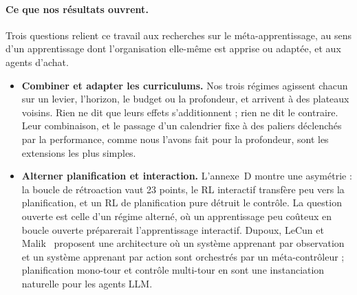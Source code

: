 \documentclass[11pt,a4paper]{article}
\begin{document}
\paragraph{Ce que nos résultats ouvrent.} Trois questions relient ce travail aux recherches sur le méta-apprentissage, au sens d'un apprentissage dont l'organisation elle-même est apprise ou adaptée, et aux agents d'achat.
\begin{itemize}
    \item \textbf{Combiner et adapter les curriculums.} Nos trois régimes agissent chacun sur un levier, l'horizon, le budget ou la profondeur, et arrivent à des plateaux voisins. Rien ne dit que leurs effets s'additionnent ; rien ne dit le contraire. Leur combinaison, et le passage d'un calendrier fixe à des paliers déclenchés par la performance, comme nous l'avons fait pour la profondeur, sont les extensions les plus simples.
    \item \textbf{Alterner planification et interaction.} L'annexe~D montre une asymétrie : la boucle de rétroaction vaut 23 points, le RL interactif transfère peu vers la planification, et un RL de planification pure détruit le contrôle. La question ouverte est celle d'un régime alterné, où un apprentissage peu coûteux en boucle ouverte préparerait l'apprentissage interactif. Dupoux, LeCun et Malik~\cite{dupoux2026why} proposent une architecture où un système apprenant par observation et un système apprenant par action sont orchestrés par un méta-contrôleur ; planification mono-tour et contrôle multi-tour en sont une instanciation naturelle pour les agents LLM.

\end{itemize}
\end{document}
